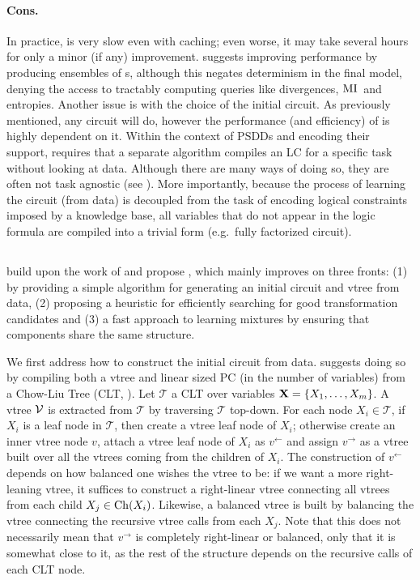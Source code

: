 \paragraph{Cons.} In practice,  is very slow even with caching; even worse, it
may take several hours for only a minor (if any) improvement. \citep{liang17} suggests improving
performance by producing ensembles of s, although this negates determinism in
the final model, denying the access to tractably computing queries like divergences, $\operatorname{\normalfont{MI}}{}$
and entropies. Another issue is with the choice of the initial circuit. As previously mentioned,
any circuit will do, however the performance (and efficiency) of  is highly
dependent on it. Within the context of PSDDs and encoding their support, 
requires that a separate algorithm compiles an LC for a specific task without looking at data.
Although there are many ways of doing so, they are often not task agnostic (see ).
More importantly, because the process of learning the circuit (from data) is decoupled from the
task of encoding logical constraints imposed by a knowledge base, all variables that do not appear
in the logic formula are compiled into a trivial form (e.g.\ fully factorized circuit).

\subsection{}

\citep{dang20} build upon the work of  and propose , which
mainly improves  on three fronts: (1) by providing a simple algorithm for
generating an initial circuit and vtree from data, (2) proposing a heuristic for efficiently
searching for good transformation candidates and (3) a fast approach to learning mixtures by
ensuring that components share the same structure.

We first address how to construct the initial circuit from data. \citeauthor{dang20} suggests doing
so by compiling both a vtree and linear sized PC (in the number of variables) from a Chow-Liu Tree
(CLT, \cite{chow68}). Let $\mathcal{T}$ a CLT over variables $\mathbf{X}=\{X_1,\ldots,X_m\}$. A vtree
$\operatorname{\mathcal{V}}$ is extracted from $\mathcal{T}$ by traversing $\mathcal{T}$ top-down. For each node
$X_i\in\mathcal{T}$, if $X_i$ is a leaf node in $\mathcal{T}$, then create a vtree leaf node of
$X_i$; otherwise create an inner vtree node $v$, attach a vtree leaf node of $X_i$ as $v^\gets$ and
assign $v^\to$ as a vtree built over all the vtrees coming from the children of $X_i$. The
construction of $v^\gets$ depends on how balanced one wishes the vtree to be: if we want a more
right-leaning vtree, it suffices to construct a right-linear vtree connecting all vtrees from each
child $X_j\in\operatorname*{\normalfont{Ch}}(X_i)$. Likewise, a balanced vtree is built by balancing the vtree connecting the
recursive vtree calls from each $X_j$. Note that this does not necessarily mean that $v^\to$ is
completely right-linear or balanced, only that it is somewhat close to it, as the rest of the
structure depends on the recursive calls of each CLT node.

